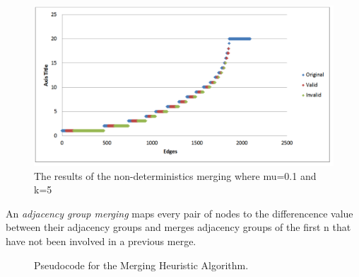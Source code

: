 \begin{figure}[htb]
  \label{merge_k_5}
  \centering
  \includegraphics[scale=0.4]{mu=0_1-k=5-non-det-merge-5.png}
  \caption{The results of the non-deterministics merging where mu=0.1 and k=5}
  \label{fig:merge_k_5}
\end{figure}

\begin{definition}
An \emph{adjacency group merging} maps every pair of nodes to  the differencence value between their adjacency groups and merges adjacency groups of the first n that have not been involved in a previous merge.
\end{definition}

\begin{figure}[htb]
	\begin{algorithmic}
		\renewcommand{\algorithmicrequire}{\textbf{Input:}}
		\renewcommand{\algorithmicensure}{\textbf{Output:}}
			\EndFor
		\EndFor
		\EndFor
			\EndIf
		\EndIf
	\end{algorithmic}
	\caption{Pseudocode for the Merging Heuristic Algorithm.}
	\label{fig:merging}
\end{figure}

